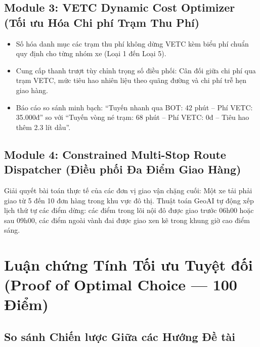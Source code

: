 \documentclass[11pt,a4paper]{article}
\begin{document}
\subsection{Module 3: VETC Dynamic Cost Optimizer (Tối ưu Hóa Chi phí Trạm Thu Phí)}
\begin{itemize}
  \item Số hóa danh mục các trạm thu phí không dừng VETC kèm biểu phí chuẩn quy định cho từng nhóm xe (Loại 1 đến Loại 5).
  \item Cung cấp thanh trượt tùy chỉnh trọng số điều phối: Cân đối giữa chi phí qua trạm VETC, mức tiêu hao nhiên liệu theo quãng đường và chi phí trễ hẹn giao hàng.
  \item Báo cáo so sánh minh bạch: ``Tuyến nhanh qua BOT: 42 phút -- Phí VETC: 35.000đ'' so với ``Tuyến vòng né trạm: 68 phút -- Phí VETC: 0đ -- Tiêu hao thêm 2.3 lít dầu''.
\end{itemize}

\subsection{Module 4: Constrained Multi-Stop Route Dispatcher (Điều phối Đa Điểm Giao Hàng)}
Giải quyết bài toán thực tế của các đơn vị giao vận chặng cuối: Một xe tải phải giao từ 5 đến 10 đơn hàng trong khu vực đô thị. Thuật toán GeoAI tự động xếp lịch thứ tự các điểm dừng: các điểm trong lõi nội đô được giao trước 06h00 hoặc sau 09h00, các điểm ngoài vành đai được giao xen kẽ trong khung giờ cao điểm sáng.

\section{Luận chứng Tính Tối ưu Tuyệt đối (Proof of Optimal Choice — 100 Điểm)}

\subsection{So sánh Chiến lược Giữa các Hướng Đề tài}
\end{document}
